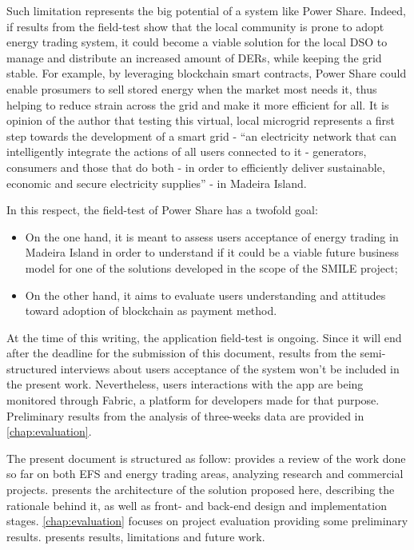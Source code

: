 Such limitation represents the big potential of a system like Power Share. Indeed, if results from the field-test show that the local community is prone to adopt energy trading system, it could become a viable solution for the local \ac{DSO} to manage and distribute an increased amount of \acp{DER}, while keeping the grid stable. For example, by leveraging blockchain smart contracts, Power Share could enable prosumers to sell stored energy when the market most needs it, thus helping to reduce strain across the grid and make it more efficient for all.
It is opinion of the author that testing this virtual, local microgrid represents a first step towards the development of a smart grid -  “an electricity network that can intelligently integrate the actions of all users connected to it - generators, consumers and those that do both - in order to efficiently deliver sustainable, economic and secure electricity supplies” \cite{OverviewSmartGrid} - in Madeira Island.


In this respect, the field-test of Power Share has a twofold goal:

\begin{itemize}
    \item On the one hand, it is meant to assess users acceptance of energy trading in Madeira Island in order to understand if it could be a viable future business model  for one of the solutions developed in the scope of the SMILE project;
\item On the other hand, it aims to evaluate users understanding  and attitudes toward adoption of blockchain as  payment method.
\end{itemize}


At the time of this writing, the application field-test is ongoing. Since it will end after the deadline for the submission of this document, results from the semi-structured interviews about users acceptance of the system won’t be included in the present work. Nevertheless, users interactions with the app are being monitored through Fabric, a platform for developers made for that purpose. Preliminary results from the analysis of three-weeks data are provided in \cref{chap:evaluation}.

The present document is structured as follow:  provides a review of the work done so far on both \ac{EFS} and energy trading areas, analyzing research and commercial projects.  presents the architecture of the solution proposed here, describing the rationale behind it, as well as front- and back-end design and implementation stages.
\cref{chap:evaluation} focuses on project evaluation providing some preliminary results.  presents results, limitations and future work.


